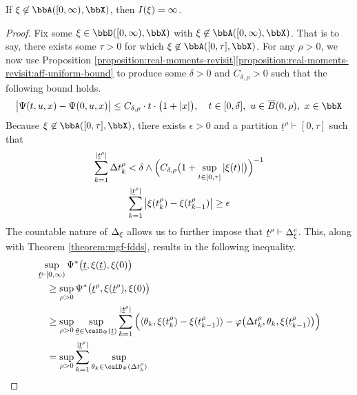 \begin{lemma}
  \label{lemma:need-ac}
  If $\pathVar \not\in \acpathSpace{[0,\infty)}{\stateSpace}$, then $I(\xi) = \infty$.
\end{lemma}
\begin{proof}
  \label{proof:lemma:need-ac}
  Fix some $\pathVar \in \pathSpace{[0,\infty)}{\stateSpace}$ with $\pathVar \not\in \acpathSpace{[0,\infty)}{\stateSpace}$.
  That is to say, there exists some $\tau > 0$ for which $\pathVar \not\in \acpathSpace{[0,\tau]}{\stateSpace}$.
  For any $\rho > 0$, we now use Proposition \ref{proposition:real-moments-revisit}\ref{proposition:real-moments-revisit:aff-uniform-bound} to produce some $\delta > 0$ and $C_{\delta,\rho} > 0$ such that the following bound holds.
  \begin{equation*}
    \big|\aff(t, \momentVar, \stateVar) - \aff(0, \momentVar, \stateVar)\big| \leq C_{\delta,\rho} \cdot t \cdot \big( 1 + |\stateVar| \big), \quad t \in [0,\delta], ~ \momentVar \in \closedBall{0}{\rho}, ~ \stateVar \in \stateSpace
  \end{equation*}
  Because $\pathVar \not\in \acpathSpace{[0,\tau]}{\stateSpace}$, there exists $\epsilon > 0$ and a partition $\underline t^\rho \vdash [0,\tau]$ such that
  \begin{gather*}
    \sum_{k=1}^{|\underline t^\rho|} \Delta t^\rho_k < \delta \wedge \Big(C_{\delta,\rho} \big( 1 + \sup_{t\in[0,\tau]}|\xi(t)| \big) \Big)^{-1} \\
    \sum_{k=1}^{|\underline t^\rho|} \big|\xi(t^\rho_k) - \xi(t^\rho_{k-1}) \big| \geq \epsilon
  \end{gather*}
  The countable nature of $\Delta_\xi$ allows us to further impose that $\underline t^\rho \vdash \Delta_\xi^c$.
  This, along with Theorem \ref{theorem:mgf-fdds}, results in the following inequality.
  \begin{align*}
    &\sup_{\underline t \vdash [0,\infty)} \aff^*\big( \underline t, \pathVar(\underline t), \pathVar(0) \big) \\
    &\quad\geq \sup_{\rho > 0} \aff^*\big( \underline t^\rho, \pathVar(\underline t^\rho), \pathVar(0) \big) \\
    &\quad\geq \sup_{\rho > 0} \sup_{\underline\twistVar \in \momentSpace(\underline t)}\sum_{k=1}^{|\underline t^\rho|}  \Big( \prj{\twistVar_k}{\pathVar(t^\rho_k)-\pathVar(t^\rho_{k-1})} -  \affShift\big( \Delta t^\rho_k, \twistVar_k, \pathVar(t^\rho_{k-1}) \big) \Big) \\
    &\quad= \sup_{\rho > 0} \sum_{k=1}^{|\underline t^\rho|} \sup_{\twistVar_k\in\momentSpace(\Delta t^\rho_k)} \begin{aligned}[t]

\end{aligned}
\end{align*}
\end{proof}
